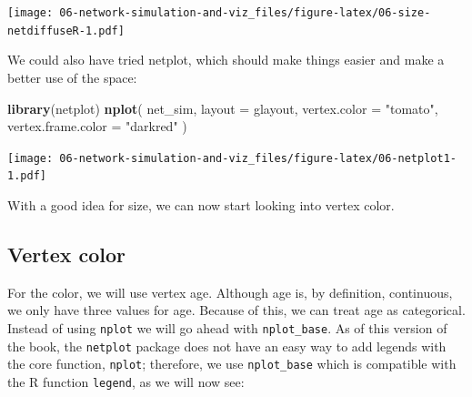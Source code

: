 \documentclass[]{book}
\newenvironment{Shaded}{\begin{snugshade}}{\end{snugshade}}
\newcommand{\CommentTok}[1]{\textcolor[rgb]{0.56,0.35,0.01}{\textit{#1}}}
\newcommand{\DataTypeTok}[1]{\textcolor[rgb]{0.13,0.29,0.53}{#1}}
\newcommand{\DecValTok}[1]{\textcolor[rgb]{0.00,0.00,0.81}{#1}}
\newcommand{\FloatTok}[1]{\textcolor[rgb]{0.00,0.00,0.81}{#1}}
\newcommand{\KeywordTok}[1]{\textcolor[rgb]{0.13,0.29,0.53}{\textbf{#1}}}
\newcommand{\NormalTok}[1]{#1}
\newcommand{\OperatorTok}[1]{\textcolor[rgb]{0.81,0.36,0.00}{\textbf{#1}}}
\newcommand{\OtherTok}[1]{\textcolor[rgb]{0.56,0.35,0.01}{#1}}
\newcommand{\StringTok}[1]{\textcolor[rgb]{0.31,0.60,0.02}{#1}}
\begin{document}
\begin{Shaded}
\end{Shaded}

\texttt{[image: 06-network-simulation-and-viz\_files/figure-latex/06-size-netdiffuseR-1.pdf]}

We could also have tried netplot, which should make things easier and make a better use of the space:

\begin{Shaded}
\begin{Highlighting}[]
\KeywordTok{library}\NormalTok{(netplot)}
\KeywordTok{nplot}\NormalTok{(}
\NormalTok{  net_sim, }\DataTypeTok{layout =}\NormalTok{ glayout,}
  \DataTypeTok{vertex.color =} \StringTok{"tomato"}\NormalTok{,}
  \DataTypeTok{vertex.frame.color =} \StringTok{"darkred"}
\NormalTok{  )}
\end{Highlighting}
\end{Shaded}

\texttt{[image: 06-network-simulation-and-viz\_files/figure-latex/06-netplot1-1.pdf]}

With a good idea for size, we can now start looking into vertex color.

\hypertarget{vertex-color}{%
\subsection{Vertex color}\label{vertex-color}}

For the color, we will use vertex age. Although age is, by definition, continuous,
we only have three values for age. Because of this, we can treat age as categorical.
Instead of using \texttt{nplot} we will go ahead with \texttt{nplot\_base}. As of this version of
the book, the \texttt{netplot} package does not have an easy way to add legends with the
core function, \texttt{nplot}; therefore, we use \texttt{nplot\_base} which is compatible with
the R function \texttt{legend}, as we will now see:
\end{document}
